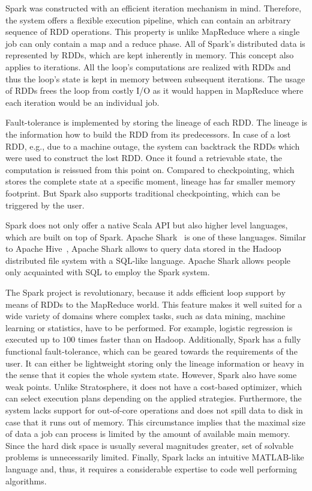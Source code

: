 Spark was constructed with an efficient iteration mechanism in mind.
Therefore, the system offers a flexible execution pipeline, which can contain an arbitrary sequence of RDD operations.
This property is unlike MapReduce where a single job can only contain a map and a reduce phase.
All of Spark's distributed data is represented by RDDs, which are kept inherently in memory.
This concept also applies to iterations.
All the loop's computations are realized with RDDs and thus the loop's state is kept in memory between subsequent iterations.
The usage of RDDs frees the loop from costly I/O as it would happen in MapReduce where each iteration would be an individual job.

Fault-tolerance is implemented by storing the lineage of each RDD.
The lineage is the information how to build the RDD from its predecessors.
In case of a lost RDD, e.g., due to a machine outage, the system can backtrack the RDDs which were used to construct the lost RDD.
Once it found a retrievable state, the computation is reissued from this point on.
Compared to checkpointing, which stores the complete state at a specific moment, lineage has far smaller memory footprint.
But Spark also supports traditional checkpointing, which can be triggered by the user.

Spark does not only offer a native Scala API but also higher level languages, which are built on top of Spark.
Apache Shark~\cite{xin:2013a} is one of these languages.
Similar to Apache Hive~\cite{hive}, Apache Shark allows to query data stored in the Hadoop distributed file system with a SQL-like language.
Apache Shark allows people only acquainted with SQL to employ the Spark system.

The Spark project is revolutionary, because it adds efficient loop support by means of RDDs to the MapReduce world.
This feature makes it well suited for a wide variety of domains where complex tasks, such as data mining, machine learning or statistics, have to be performed.
For example, logistic regression is executed up to $100$ times faster than on Hadoop.
Additionally, Spark has a fully functional fault-tolerance, which can be geared towards the requirements of the user.
It can either be lightweight storing only the lineage information or heavy in the sense that it copies the whole system state.
However, Spark also have some weak points.
Unlike Stratosphere, it does not have a cost-based optimizer, which can select execution plans depending on the applied strategies.
Furthermore, the system lacks support for out-of-core operations and does not spill data to disk in case that it runs out of memory.
This circumstance implies that the maximal size of data a job can process is limited by the amount of available main memory.
Since the hard disk space is usually several magnitudes greater, set of solvable problems is unnecessarily limited.
Finally, Spark lacks an intuitive MATLAB-like language and, thus, it requires a considerable expertise to code well performing algorithms.

